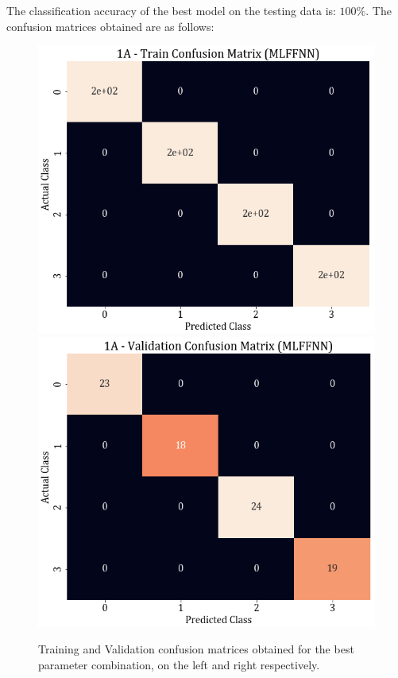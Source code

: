 \documentclass[11pt,a4paper]{article}
\newcommand{\noi}{\noindent}
\begin{document}
\noi
The classification accuracy of the best model on the testing data is: $100\%$. The confusion matrices obtained are as follows:
\begin{figure}[H]
    \centering
    \includegraphics[scale=0.35]{images/1A_MLFFNN_train_confmat.png}
    \includegraphics[scale=0.35]{images/1A_MLFFNN_val_confmat.png}
    \caption{Training and Validation confusion matrices obtained for the best parameter combination, on the left and right respectively.}
\end{figure}
\end{document}

